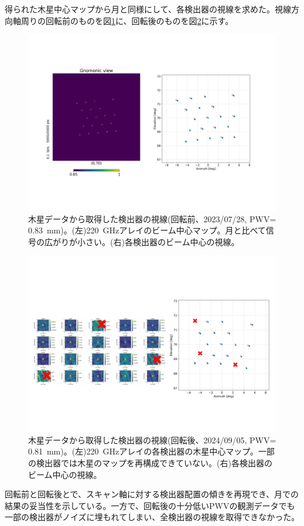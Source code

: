 得られた木星中心マップから月と同様にして、各検出器の視線を求めた。視線方向軸周りの回転前のものを図\ref{5987_jupiter_pos}に、回転後のものを図\ref{11280_jupiter_pos}に示す。
\begin{figure}[htbp]
  \centering
  \includegraphics[width=1.0\columnwidth]{5_alignment/figs/5987_jupiter_pos.pdf}
  \caption{木星データから取得した検出器の視線(回転前、2023/07/28, PWV= \SI{0.83}{mm})。(左)\SI{220}{GHz}アレイのビーム中心マップ。月と比べて信号の広がりが小さい。(右)各検出器のビーム中心の視線。}
  \label{5987_jupiter_pos}
\end{figure}
\begin{figure}[htbp]
  \centering
  \includegraphics[width=1.0\columnwidth]{5_alignment/figs/11280_jupiter.pdf}
  \caption{木星データから取得した検出器の視線(回転後、2024/09/05, PWV= \SI{0.81}{mm})。(左)\SI{220}{GHz}アレイの各検出器の木星中心マップ。一部の検出器では木星のマップを再構成できていない。(右)各検出器のビーム中心の視線。}
  \label{11280_jupiter_pos}
\end{figure}
回転前と回転後とで、スキャン軸に対する検出器配置の傾きを再現でき、月での結果の妥当性を示している。一方で、回転後の十分低いPWVの観測データでも一部の検出器がノイズに埋もれてしまい、全検出器の視線を取得できなかった。

